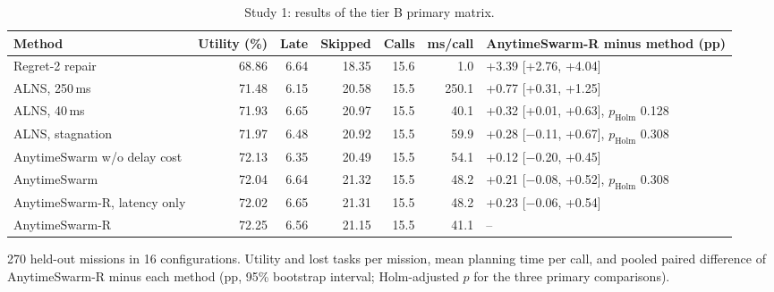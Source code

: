 \begin{table}[t]
\caption{Study 1: results of the tier B primary matrix.}\label{tab:main}
\centering\small
\setlength{\tabcolsep}{3pt}
\begin{threeparttable}
\begin{tabular}{lrrrrrl}
\toprule
Method & Utility (\%) & Late & Skipped & Calls & ms/call & AnytimeSwarm-R minus method (pp) \\
\midrule
Regret-2 repair & 68.86 & 6.64 & 18.35 & 15.6 & 1.0 & +3.39 [+2.76, +4.04] \\
ALNS, 250\,ms & 71.48 & 6.15 & 20.58 & 15.5 & 250.1 & +0.77 [+0.31, +1.25] \\
ALNS, 40\,ms & 71.93 & 6.65 & 20.97 & 15.5 & 40.1 & +0.32 [+0.01, +0.63], $p_{\mathrm{Holm}}$ 0.128 \\
ALNS, stagnation & 71.97 & 6.48 & 20.92 & 15.5 & 59.9 & +0.28 [$-$0.11, +0.67], $p_{\mathrm{Holm}}$ 0.308 \\
AnytimeSwarm w/o delay cost & 72.13 & 6.35 & 20.49 & 15.5 & 54.1 & +0.12 [$-$0.20, +0.45] \\
AnytimeSwarm & 72.04 & 6.64 & 21.32 & 15.5 & 48.2 & +0.21 [$-$0.08, +0.52], $p_{\mathrm{Holm}}$ 0.308 \\
AnytimeSwarm-R, latency only & 72.02 & 6.65 & 21.31 & 15.5 & 48.2 & +0.23 [$-$0.06, +0.54] \\
AnytimeSwarm-R & 72.25 & 6.56 & 21.15 & 15.5 & 41.1 & -- \\
\bottomrule
\end{tabular}
\begin{tablenotes}[flushleft]\scriptsize
\item[] 270 held-out missions in 16 configurations. Utility and lost tasks per mission, mean planning time per call, and pooled paired difference of AnytimeSwarm-R minus each method (pp, 95\% bootstrap interval; Holm-adjusted $p$ for the three primary comparisons).
\end{tablenotes}
\end{threeparttable}
\end{table}
